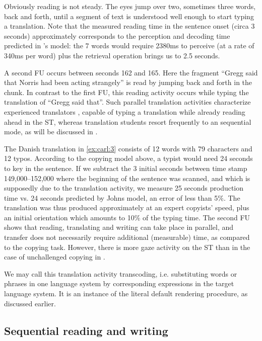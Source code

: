 \documentclass[output=paper]{LSP/langsci}
\begin{document}
Obviously reading is not steady. The eyes jump over two, sometimes three words, back and forth, until a segment of text is understood well enough to start typing a translation. Note that the measured reading time in the sentence onset (circa 3 seconds) approximately corresponds to the perception and decoding time predicted in \citeauthor{John1996}'s model: the 7 words would require 2380ms to perceive (at a rate of 340ms per word) plus the retrieval operation brings us to 2.5 seconds. 

A second FU occurs between seconds 162 and 165. Here the fragment ``Gregg said that Norris had been acting strangely'' is read by jumping back and forth in the chunk. In contrast to the first FU, this reading activity occurs while typing the translation of ``Gregg said that''. Such parallel translation activities characterize experienced translators \citep{Carl2011}, capable of typing a translation while already reading ahead in the ST, whereas translation students resort frequently to an sequential mode, as will be discussed in . 

The Danish translation in \ref{ex:carl:3} consists of 12 words with 79 characters and 12 typos. According to the copying model above, a typist would need 24 seconds to key in the sentence. If we subtract the 3 initial seconds between time stamp 149,000--152,000 where the beginning of the sentence was scanned, and which is supposedly due to the translation activity, we measure 25 seconds production time vs. 24 seconds predicted by Johns model, an error of less than 5\%. The translation was thus produced approximately at an expert copyists' speed, plus an initial orientation which amounts to 10\% of the typing time. The second FU shows that reading, translating and writing can take place in parallel, and transfer does not necessarily require additional (measurable) time, as compared to the copying task. However, there is more gaze activity on the ST than in the case of unchallenged copying in .

\newpage 
We may call this translation activity {\sc transcoding}, i.e. substituting words or phrases in one language system by corresponding expressions in the target language system. It is an instance of the literal default rendering procedure, as discussed earlier. 

\subsection{Sequential reading and writing}\label{sec:carl:4.2}
\end{document}
